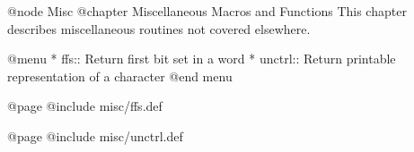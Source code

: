 @node Misc
@chapter Miscellaneous Macros and Functions
This chapter describes miscellaneous routines not covered elsewhere.

@menu
* ffs::      Return first bit set in a word
* unctrl::   Return printable representation of a character
@end menu

@page
@include misc/ffs.def

@page
@include misc/unctrl.def
